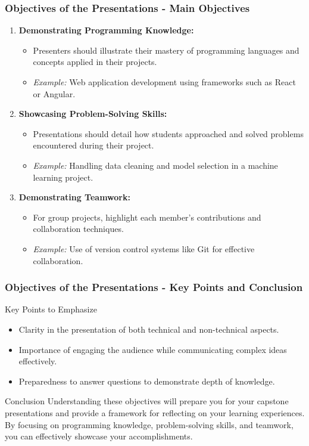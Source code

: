 \documentclass{beamer}
\begin{document}
\begin{frame}[fragile]
    \frametitle{Objectives of the Presentations - Main Objectives}
    \begin{enumerate}
        \item \textbf{Demonstrating Programming Knowledge:}
        \begin{itemize}
            \item Presenters should illustrate their mastery of programming languages and concepts applied in their projects.
            \item \textit{Example:} Web application development using frameworks such as React or Angular.
        \end{itemize}
        
        \item \textbf{Showcasing Problem-Solving Skills:}
        \begin{itemize}
            \item Presentations should detail how students approached and solved problems encountered during their project.
            \item \textit{Example:} Handling data cleaning and model selection in a machine learning project.
        \end{itemize}
        
        \item \textbf{Demonstrating Teamwork:}
        \begin{itemize}
            \item For group projects, highlight each member's contributions and collaboration techniques.
            \item \textit{Example:} Use of version control systems like Git for effective collaboration.
        \end{itemize}
    \end{enumerate}
\end{frame}

\begin{frame}[fragile]
    \frametitle{Objectives of the Presentations - Key Points and Conclusion}
    \begin{block}{Key Points to Emphasize}
        \begin{itemize}
            \item Clarity in the presentation of both technical and non-technical aspects.
            \item Importance of engaging the audience while communicating complex ideas effectively.
            \item Preparedness to answer questions to demonstrate depth of knowledge.
        \end{itemize}
    \end{block}
    
    \begin{block}{Conclusion}
        Understanding these objectives will prepare you for your capstone presentations and provide a framework for reflecting on your learning experiences. By focusing on programming knowledge, problem-solving skills, and teamwork, you can effectively showcase your accomplishments.
    \end{block}
\end{frame}
\end{document}
